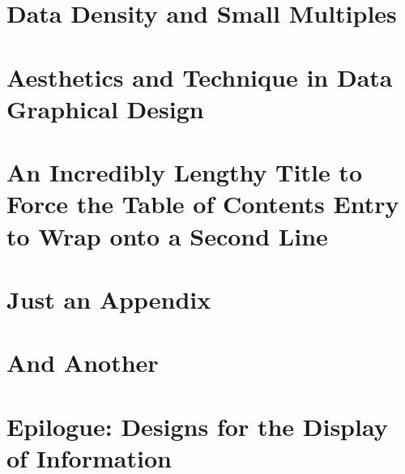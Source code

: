 \documentclass{bayeshyp}
\begin{document}
\chapter{Data Density and Small Multiples}
\setcounter{page}{161}

\chapter{Aesthetics and Technique in Data Graphical Design}
\setcounter{page}{177}

\chapter{An Incredibly Lengthy Title to Force the Table of Contents Entry to Wrap onto a Second Line}
\setcounter{page}{181}

\appendix

\chapter{Just an Appendix}
\setcounter{page}{183}

\chapter{And Another}
\setcounter{page}{185}

\backmatter
\chapter{Epilogue: Designs for the Display of Information}
\setcounter{page}{191}



\end{document}
